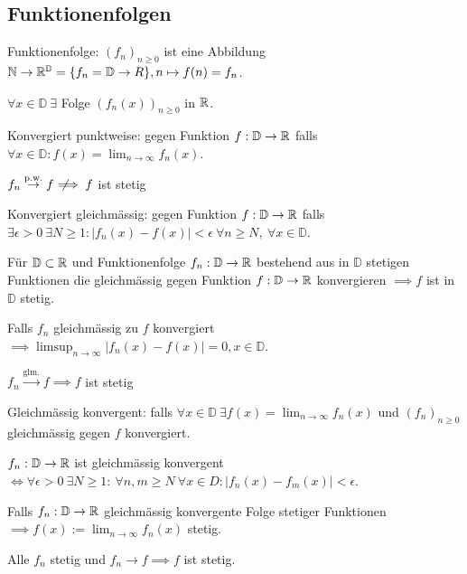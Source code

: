 \subsection{Funktionenfolgen}
\begin{compactdesc}
    \item[Funktionenfolge:] $\left( f_n \right)_{n \ge 0}$ ist eine Abbildung $\mathbb{N} \to \mathbb{R}^\mathbb{D} = \{f_n = \mathbb{D} \to R\}, n \mapsto f(n) = f_n$.
    \begin{compactitem}
        \item $\forall x \in \mathbb{D} \ \exists$ Folge $\left( f_n(x) \right)_{n \ge 0}$ in $\mathbb{R}$.
    \end{compactitem}
    \item[Konvergiert punktweise:] gegen Funktion $f: \mathbb{D} \to \mathbb{R}$ falls $\forall x \in \mathbb{D}: f(x) = \lim_{n \to \infty} f_n(x)$.
        \begin{compactitem}
            \item $f_n \overset{\text{p.w.}}{\to} f \;\not\!\!\!\implies f$ ist stetig
        \end{compactitem}
    \item[Konvergiert gleichmässig:] gegen Funktion $f: \mathbb{D} \to \mathbb{R}$ falls $\exists \epsilon > 0 \ \exists N \ge 1: \left| f_n(x) - f(x) \right| < \epsilon \ \forall n \ge N,\ \forall x \in \mathbb{D}$.
        \begin{compactitem}
            \item Für $\mathbb{D} \subset \mathbb{R}$ und Funktionenfolge $f_n:\mathbb{D} \to \mathbb{R}$ bestehend aus in $\mathbb{D}$ stetigen Funktionen die gleichmässig gegen Funktion $f: \mathbb{D} \to \mathbb{R}$ konvergieren $\implies f$ ist in $\mathbb{D}$ stetig.
            \item Falls $f_n$ gleichmässig zu $f$ konvergiert $\implies \limsup_{n \to \infty} \left| f_n(x) - f(x) \right| = 0, x \in \mathbb{D}$.
            \item $f_n \overset{\text{glm.}}{\to} f \implies f$ ist stetig
        \end{compactitem}
    \item[Gleichmässig konvergent:] falls $\forall x \in \mathbb{D} \ \exists f(x) = \lim_{n \to \infty} f_n(x)$ und $\left( f_n \right)_{n \ge 0}$ gleichmässig gegen $f$ konvergiert.
        \begin{compactitem}
            \item $f_n : \mathbb{D} \to \mathbb{R}$ ist gleichmässig konvergent $\iff \forall \epsilon > 0 \ \exists N \ge 1: \ \forall n,m \ge N \ \forall x \in D: \left| f_n(x) - f_m(x) \right| < \epsilon$.
            \item Falls $f_n:\mathbb{D} \to \mathbb{R}$ gleichmässig konvergente Folge stetiger Funktionen $\implies f(x) := \lim_{n \to \infty} f_n(x)$ stetig.
            \item Alle $f_n$ stetig und $f_n \to f \implies f$ ist stetig.
        \end{compactitem}
\end{compactdesc}

